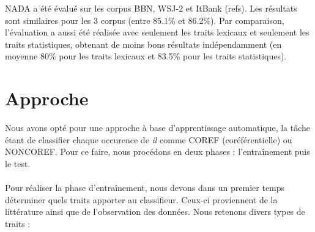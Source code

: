 \documentclass[a4paper,12pt]{article}
\begin{document}
NADA a été évalué sur les corpus BBN, WSJ-2 et ItBank (refs). Les résultats sont similaires pour les 3 corpus (entre 85.1\% et 86.2\%). Par comparaison, l'évaluation a aussi été réalisée avec seulement les traits lexicaux et seulement les traits statistiques, obtenant de moins bons résultats indépendamment (en moyenne 80\% pour les traits lexicaux et 83.5\% pour les traits statistiques).



\section{Approche}

Nous avons opté pour une approche à base d'apprentissage automatique, la tâche étant de classifier chaque occurence de \og{}\textit{il}\fg{} comme COREF (coréférentielle) ou NONCOREF.
Pour ce faire, nous procédons en deux phases : l'entraînement puis le test.

\paragraph{}
Pour réaliser la phase d'entraînement, nous devons dans un premier temps déterminer quels traits apporter au classifieur. Ceux-ci proviennent de la littérature ainsi que de l'observation des données.
Nous retenons divers types de traits :
\end{document}
